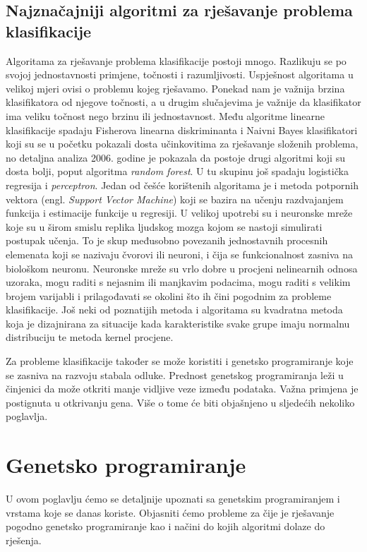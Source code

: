 \documentclass[times, utf8, zavrsni]{fer}
\begin{document}
\section{Najznačajniji algoritmi za rješavanje problema klasifikacije}
Algoritama za rješavanje problema klasifikacije postoji mnogo. Razlikuju se po svojoj jednostavnosti primjene, točnosti i razumljivosti. Uspješnost algoritama u velikoj mjeri ovisi o problemu kojeg rješavamo. Ponekad nam je važnija brzina klasifikatora od njegove točnosti, a u drugim slučajevima je važnije da klasifikator ima veliku točnost nego brzinu ili jednostavnost. Među algoritme linearne klasifikacije spadaju Fisherova linearna diskriminanta i Naivni Bayes klasifikatori koji su se u početku pokazali dosta učinkovitima za rješavanje složenih problema, no detaljna analiza 2006. godine je pokazala da postoje drugi algoritmi koji su dosta bolji, poput algoritma \textit{random forest}. U tu skupinu još spadaju logistička regresija i \textit{perceptron}. Jedan od češće korištenih algoritama je i metoda potpornih vektora (engl. \textit{Support Vector Machine}) koji se bazira na učenju razdvajanjem funkcija i estimacije funkcije u regresiji. U velikoj upotrebi su i neuronske mreže koje su u širom smislu replika ljudskog mozga kojom se nastoji simulirati postupak učenja. To je skup međusobno povezanih jednostavnih procesnih elemenata koji se nazivaju čvorovi ili neuroni, i čija se funkcionalnost zasniva na biološkom neuronu. Neuronske mreže su vrlo dobre u procjeni nelinearnih odnosa uzoraka, mogu raditi s nejasnim ili manjkavim podacima, mogu raditi s velikim brojem varijabli i prilagođavati se okolini što ih čini pogodnim za probleme klasifikacije. Još neki od poznatijih metoda i algoritama su kvadratna metoda koja je dizajnirana za situacije kada karakteristike svake grupe imaju normalnu distribuciju te metoda kernel procjene.

Za probleme klasifikacije također se može koristiti i genetsko programiranje koje se zasniva na razvoju stabala odluke. Prednost genetskog programiranja leži u činjenici da može otkriti manje vidljive veze između podataka. Važna primjena je postignuta u otkrivanju gena. Više o tome će biti objašnjeno u sljedećih nekoliko poglavlja.


\chapter{Genetsko programiranje}
U ovom poglavlju ćemo se detaljnije upoznati sa genetskim programiranjem i vrstama koje se danas koriste. Objasniti ćemo probleme za čije je rješavanje pogodno genetsko programiranje kao i načini do kojih algoritmi dolaze do rješenja.
\end{document}
